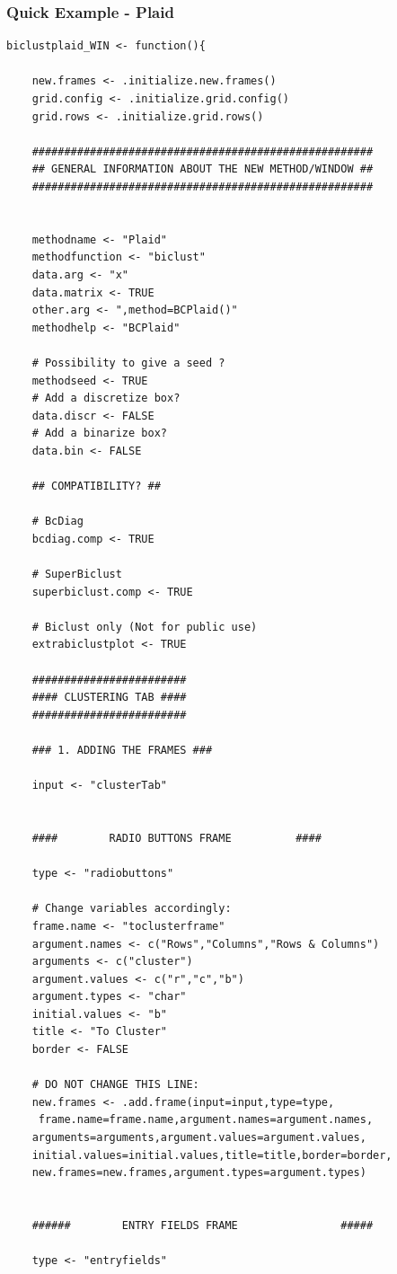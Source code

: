 \documentclass[a4paper]{article}\usepackage[]{graphicx}\usepackage[]{color}
\begin{document}
\subsubsection{Quick Example - Plaid}
\begin{verbatim}
biclustplaid_WIN <- function(){     
	
	new.frames <- .initialize.new.frames()
	grid.config <- .initialize.grid.config()
	grid.rows <- .initialize.grid.rows()
		
	#####################################################
	## GENERAL INFORMATION ABOUT THE NEW METHOD/WINDOW ##
	#####################################################
	

	methodname <- "Plaid"
	methodfunction <- "biclust"
	data.arg <- "x"
	data.matrix <- TRUE
	other.arg <- ",method=BCPlaid()"   
	methodhelp <- "BCPlaid"
	
	# Possibility to give a seed ?
	methodseed <- TRUE
	# Add a discretize box?
	data.discr <- FALSE
	# Add a binarize box?
	data.bin <- FALSE
	
	## COMPATIBILITY? ##
	
	# BcDiag
	bcdiag.comp <- TRUE
	
	# SuperBiclust
	superbiclust.comp <- TRUE
	
	# Biclust only (Not for public use)
	extrabiclustplot <- TRUE
	
	########################
	#### CLUSTERING TAB ####
	########################
	
	### 1. ADDING THE FRAMES ###
	
	input <- "clusterTab"
	
	
	####		RADIO BUTTONS FRAME 		 ####
	
	type <- "radiobuttons"
	
	# Change variables accordingly:
	frame.name <- "toclusterframe"
	argument.names <- c("Rows","Columns","Rows & Columns")   
	arguments <- c("cluster")		
	argument.values <- c("r","c","b")
	argument.types <- "char"
	initial.values <- "b" 
	title <- "To Cluster"
	border <- FALSE
	
	# DO NOT CHANGE THIS LINE:
	new.frames <- .add.frame(input=input,type=type,
     frame.name=frame.name,argument.names=argument.names,
    arguments=arguments,argument.values=argument.values,
    initial.values=initial.values,title=title,border=border,
    new.frames=new.frames,argument.types=argument.types)	
	
	
	######		  ENTRY FIELDS FRAME 				#####
	
	type <- "entryfields"
	

\end{verbatim}
\end{document}
